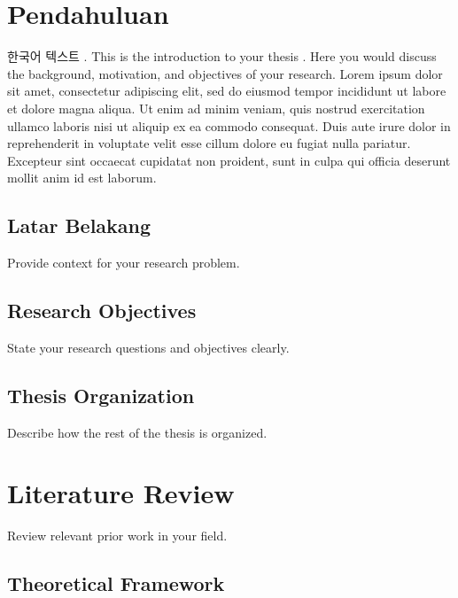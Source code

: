 \newpage 
\cleardoublepage
\mainmatterpagenumbers

\chapter{Pendahuluan}

한국어 텍스트 \cite{reference1}. This is the introduction to your thesis \cite{reference2}. Here you would discuss the background, motivation, and objectives of your research. 
Lorem ipsum dolor sit amet, consectetur adipiscing elit, sed do eiusmod tempor incididunt ut labore et dolore magna aliqua. Ut enim ad minim veniam, quis nostrud exercitation ullamco laboris nisi ut aliquip ex ea commodo consequat. Duis aute irure dolor in reprehenderit in voluptate velit esse cillum dolore eu fugiat nulla pariatur. Excepteur sint occaecat cupidatat non proident, sunt in culpa qui officia deserunt mollit anim id est laborum.

\section{Latar Belakang}

\noindent Provide context for your research problem.

\section{Research Objectives}

State your research questions and objectives clearly.

\section{Thesis Organization}

\noindent Describe how the rest of the thesis is organized.

\chapter{Literature Review}

Review relevant prior work in your field.

\section{Theoretical Framework}


